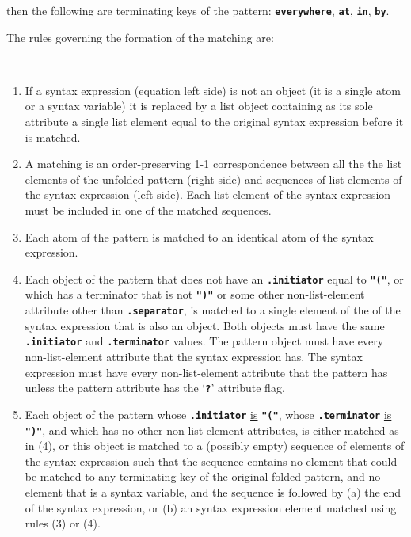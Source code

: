 \documentclass[12pt]{article}
\newcommand{\TT}[1]{{\tt \bfseries #1}}
\newcommand{\ikey}[2]{{\bf \em #1}\index{#2}}
\newenvironment{indpar}[1][0.3in]%
	{\begin{list}{}%
		     {\setlength{\itemsep}{0in}%
		      \setlength{\topsep}{0in}%
		      \setlength{\parsep}{1ex}%
		      \setlength{\labelwidth}{#1}%
		      \setlength{\leftmargin}{#1}%
		      \addtolength{\leftmargin}{\labelsep}}%
	 \item}%
	{\end{list}}
\begin{document}
then the following are terminating keys of the pattern: \TT{everywhere},
\TT{at}, \TT{in}, \TT{by}.



The rules governing the formation of the matching are:

\begin{indpar}
\begin{list}{}{}
\item[\ikey{Pattern Matching Rules}%
           {pattern matching rules}%
	   \index{matching rules}%
	   \label{PATTERN-MATCHING-RULES}:]~

\begin{enumerate}

\item If a syntax expression (equation left side) is not an object
(it is a single atom or a syntax variable)
it is replaced by a list object containing as its
sole attribute a single list element equal to the original syntax expression
before it is matched.

\item A matching is an order-preserving
1-1 correspondence between all the the list elements of
the unfolded pattern (right side)
and sequences of list elements of the syntax expression (left side).
Each list element of the syntax expression must be included in
one of the matched sequences.

\item Each atom of the pattern is matched to an identical atom of the
syntax expression.

\item Each object of the pattern that does not have
an \TT{.initiator} equal to \TT{"("},
or which has a terminator that is not \TT{")"} or
some other non-list-element attribute other than \TT{.separator},
is match\-ed to a single element of the of the syntax expression
that is also an object.  Both objects must have the same
\TT{.initiator} and \TT{.terminator} values.  The pattern object
must have every
non-list-element attribute that the syntax expression has.
The syntax expression must have every non-list-element attribute that
the pattern has unless the pattern attribute has the `\TT{?}' attribute
flag.

\item Each object of the pattern whose \TT{.initiator} \underline{is}
\TT{"("}, whose \TT{.ter\-min\-a\-tor} \underline{is} \TT{")"},
and which has \underline{no other} non-list-element attributes,
is either matched as in (4), or this object
is matched to a (possibly empty)
sequence of elements of the syntax expression such that
the sequence contains no element that could be matched to any
terminating key of the original folded pattern, and no element
that is a syntax variable, and the sequence is
followed by (a) the end of the syntax expression, or (b)
an syntax expression element matched using rules (3) or (4).


\end{enumerate}
\end{list}
\end{indpar}
\end{document}
